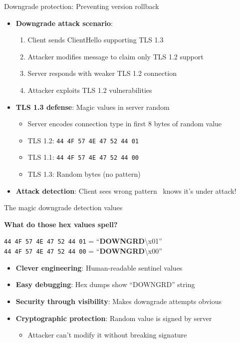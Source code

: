 \documentclass[aspectratio=169, lualatex, handout]{beamer}
\begin{document}
\begin{frame}{Downgrade protection: Preventing version rollback}
	\begin{itemize}[<+->]
		\item \textbf{Downgrade attack scenario}:
		      \begin{enumerate}
			      \item Client sends ClientHello supporting TLS 1.3
			      \item Attacker modifies message to claim only TLS 1.2 support
			      \item Server responds with weaker TLS 1.2 connection
			      \item Attacker exploits TLS 1.2 vulnerabilities
		      \end{enumerate}
		\item \textbf{TLS 1.3 defense}: Magic values in server random
		      \begin{itemize}
			      \item Server encodes connection type in first 8 bytes of random value
			      \item TLS 1.2: \texttt{44 4F 57 4E 47 52 44 01}
			      \item TLS 1.1: \texttt{44 4F 57 4E 47 52 44 00}
			      \item TLS 1.3: Random bytes (no pattern)
		      \end{itemize}
		\item \textbf{Attack detection}: Client sees wrong pattern \rightarrow\ knows it's under attack!
	\end{itemize}
\end{frame}

\begin{frame}{The magic downgrade detection values}
	\begin{center}
		\textbf{What do those hex values spell?}
	\end{center}
	\pause
	\begin{center}
		\texttt{44 4F 57 4E 47 52 44 01} = ``\textbf{DOWNGRD}\textbackslash x01''\\
		\texttt{44 4F 57 4E 47 52 44 00} = ``\textbf{DOWNGRD}\textbackslash x00''
	\end{center}
	\pause
	\begin{itemize}[<+->]
		\item \textbf{Clever engineering}: Human-readable sentinel values
		\item \textbf{Easy debugging}: Hex dumps show ``DOWNGRD'' string
		\item \textbf{Security through visibility}: Makes downgrade attempts obvious
		\item \textbf{Cryptographic protection}: Random value is signed by server
		      \begin{itemize}
			      \item Attacker can't modify it without breaking signature
		      \end{itemize}
	\end{itemize}
\end{frame}
\end{document}
